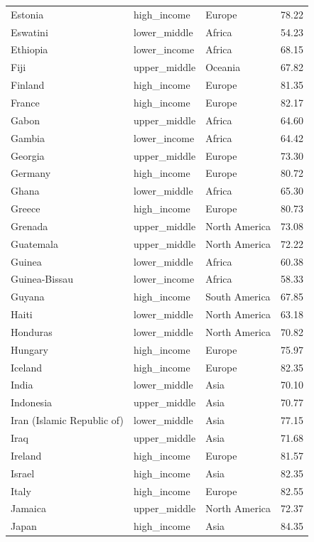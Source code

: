 \documentclass[
  letterpaper,
  DIV=11,
  numbers=noendperiod]{scrartcl}
\begin{document}
\begin{longtable}[t]{llll}
Estonia & high\_income & Europe & 78.22\\
\addlinespace
Eswatini & lower\_middle & Africa & 54.23\\
Ethiopia & lower\_income & Africa & 68.15\\
Fiji & upper\_middle & Oceania & 67.82\\
Finland & high\_income & Europe & 81.35\\
France & high\_income & Europe & 82.17\\
\addlinespace
Gabon & upper\_middle & Africa & 64.60\\
Gambia & lower\_income & Africa & 64.42\\
Georgia & upper\_middle & Europe & 73.30\\
Germany & high\_income & Europe & 80.72\\
Ghana & lower\_middle & Africa & 65.30\\
\addlinespace
Greece & high\_income & Europe & 80.73\\
Grenada & upper\_middle & North America & 73.08\\
Guatemala & upper\_middle & North America & 72.22\\
Guinea & lower\_middle & Africa & 60.38\\
Guinea-Bissau & lower\_income & Africa & 58.33\\
\addlinespace
Guyana & high\_income & South America & 67.85\\
Haiti & lower\_middle & North America & 63.18\\
Honduras & lower\_middle & North America & 70.82\\
Hungary & high\_income & Europe & 75.97\\
Iceland & high\_income & Europe & 82.35\\
\addlinespace
India & lower\_middle & Asia & 70.10\\
Indonesia & upper\_middle & Asia & 70.77\\
Iran (Islamic Republic of) & lower\_middle & Asia & 77.15\\
Iraq & upper\_middle & Asia & 71.68\\
Ireland & high\_income & Europe & 81.57\\
\addlinespace
Israel & high\_income & Asia & 82.35\\
Italy & high\_income & Europe & 82.55\\
Jamaica & upper\_middle & North America & 72.37\\
Japan & high\_income & Asia & 84.35\\

\end{longtable}
\end{document}
